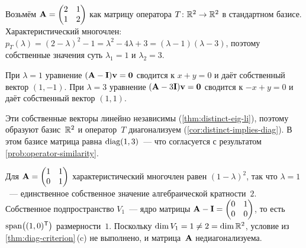 \begin{example}
\label{ex:diag-distinct}
Возьмём $\mathbf{A} = \begin{pmatrix} 2 & 1 \\ 1 & 2 \end{pmatrix}$ как
матрицу оператора $T \colon \mathbb{R}^2 \to \mathbb{R}^2$ в стандартном базисе.
Характеристический многочлен:
$p_T(\lambda) = (2 - \lambda)^2 - 1 = \lambda^2 - 4\lambda + 3 = (\lambda - 1)(\lambda - 3)$,
поэтому собственные значения суть $\lambda_1 = 1$ и $\lambda_2 = 3$.

При $\lambda = 1$ уравнение $(\mathbf{A} - \mathbf{I})\mathbf{v} = \mathbf{0}$
сводится к $x + y = 0$ и даёт собственный вектор $(1, -1)$. При
$\lambda = 3$ уравнение $(\mathbf{A} - 3\mathbf{I})\mathbf{v} = \mathbf{0}$
сводится к $-x + y = 0$ и даёт собственный вектор $(1, 1)$.

Эти собственные векторы линейно независимы (\cref{thm:distinct-eig-li}),
поэтому образуют базис~$\mathbb{R}^2$ и оператор~$T$ диагонализуем
(\cref{cor:distinct-implies-diag}). В этом базисе матрица равна
$\operatorname{diag}(1, 3)$~--- что согласуется с результатом
\cref{prob:operator-similarity}.
\end{example}

\begin{example}
\label{ex:not-diag}
Для $\mathbf{A} = \begin{pmatrix} 1 & 1 \\ 0 & 1 \end{pmatrix}$
характеристический многочлен равен $(1 - \lambda)^2$, так что
$\lambda = 1$~--- единственное собственное значение алгебраической
кратности~$2$. Собственное подпространство $V_1$~--- ядро матрицы
$\mathbf{A} - \mathbf{I} = \begin{pmatrix} 0 & 1 \\ 0 & 0 \end{pmatrix}$,
то есть $\operatorname{span}\bigl((1, 0)^{\mathsf{T}}\bigr)$ размерности~$1$. Поскольку
$\dim V_1 = 1 \neq 2 = \dim \mathbb{R}^2$, условие из
\cref{thm:diag-criterion}\,(c) не выполнено, и матрица~$\mathbf{A}$
недиагонализуема.
\end{example}

